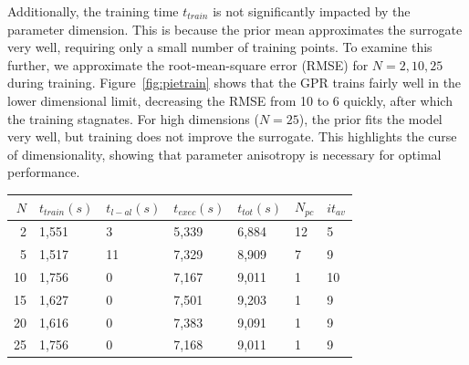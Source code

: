 Additionally, the training time $t_{train}$ is not significantly impacted by the parameter dimension.
This is because the prior mean approximates the surrogate very well, requiring only a small number of training points.
To examine this further, we approximate the root-mean-square error (RMSE) for $N=2,10,25$ during training.
Figure~\ref{fig:pietrain} shows that the GPR trains fairly well in the lower dimensional limit, decreasing the RMSE from 10 to 6 quickly, after which the training stagnates.
For high dimensions ($N=25$), the prior fits the model very well, but training does not improve the surrogate.
This highlights the curse of dimensionality, showing that parameter anisotropy is necessary for optimal performance.
\begin{table}
    \centering
    \begin{tabular}{r|l|l|l|l|l|l}
        $N$&$t_{train}(s)$&$t_{l-al}(s)$&$t_{exec}(s)$&$t_{tot}(s)$&$N_{pc}$&$it_{av}$\\\hline
        2 & 1,551 & 3 & 5,339 & 6,884 & 12 & 5 \\
        5 & 1,517 & 11 & 7,329 & 8,909 & 7 & 9 \\
        10 & 1,756 & 0 & 7,167 & 9,011 & 1 & 10 \\
        15 & 1,627 & 0 & 7,501 & 9,203 & 1 & 9 \\
        20 & 1,616 & 0 & 7,383 & 9,091 & 1 & 9 \\
        25 & 1,756 & 0 & 7,168 & 9,011 & 1 & 9 \\
    \end{tabular}
    \label{tab:eta025}
\end{table}
